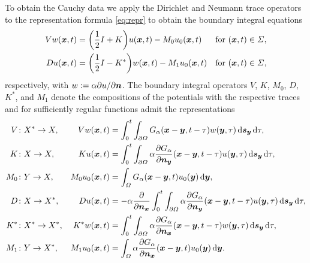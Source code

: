 \documentclass[a4paper,11pt]{article}
\begin{document}
To obtain the Cauchy data we apply the Dirichlet and Neumann trace operators to the representation formula \eqref{eq:repr} to obtain the boundary integral equations \cite{Cos1990,Cos2004,Noo1988,DohNiiSte2018}
\begin{align*}
  Vw({{\bm{x}}},t) &= \bigg(\frac{1}{2} I + K \bigg) u({{\bm{x}}},t) - M_0 u_0({{\bm{x}}},t) &&\text{for } ({{\bm{x}}},t) \in \Sigma, \\
  Du({{\bm{x}}},t) &= \bigg(\frac{1}{2} I - K^\ast \bigg) w({{\bm{x}}},t) - M_1 u_0({{\bm{x}}},t) &&\text{for } ({{\bm{x}}},t) \in \Sigma,
\end{align*}
respectively, with $w := \alpha\partial u/\partial {\ensuremath{{\bm{n}}}} $. The boundary integral operators $V$, $K$, $M_0$, $D$, $K^\ast$, and $M_1$ denote the compositions of the potentials with the respective traces and for sufficiently regular functions admit the representations
\begin{align*}
  V &\colon X^\ast \to X, &Vw({{\bm{x}}},t) &= \int_0^t \int_{\partial\Omega} G_\alpha({{\bm{x}}}-{{\bm{y}}},t-\tau) w({{\bm{y}}},\tau) \,{\mathrm{d}}{{\bm{s}}}_{{\bm{y}}} \,{\mathrm{d}}\tau, \\
  K &\colon X \to X, &Ku({{\bm{x}}},t) &= \int_0^t \int_{\partial\Omega} \alpha\frac{\partial G_\alpha}{\partial {\ensuremath{{\bm{n}}}}_{{\bm{y}}}}({{\bm{x}}}-{{\bm{y}}},t-\tau) u({{\bm{y}}},\tau) \,{\mathrm{d}}{{\bm{s}}}_{{\bm{y}}} \,{\mathrm{d}}\tau, \\
  M_0 &\colon Y \to X, &M_0 u_0({{\bm{x}}},t) &= \int_\Omega G_\alpha({{\bm{x}}}-{{\bm{y}}},t) u_0({{\bm{y}}}) \,{\mathrm{d}}{{\bm{y}}}, \\
  D &\colon X \to X^\ast, &Du({{\bm{x}}},t) &= -\alpha \frac{\partial}{\partial {\ensuremath{{\bm{n}}}}_{{\bm{x}}}} \int_0^t \int_{\partial\Omega} \alpha\frac{\partial G_\alpha}{\partial {\ensuremath{{\bm{n}}}}_{{\bm{y}}}}({{\bm{x}}}-{{\bm{y}}},t-\tau) u({{\bm{y}}},\tau) \,{\mathrm{d}}{{\bm{s}}}_{{\bm{y}}} \,{\mathrm{d}}\tau, \\
  K^\ast &\colon X^\ast \to X^\ast, &K^\ast w({{\bm{x}}},t) &= \int_0^t \int_{\partial\Omega} \alpha\frac{\partial G_\alpha}{\partial {\ensuremath{{\bm{n}}}}_{{\bm{x}}}}({{\bm{x}}}-{{\bm{y}}},t-\tau) w({{\bm{y}}},\tau) \,{\mathrm{d}}{{\bm{s}}}_{{\bm{y}}} \,{\mathrm{d}}\tau, \\
  M_1 &\colon Y \to X^\ast, &M_1 u_0({{\bm{x}}},t) &= \int_\Omega \alpha\frac{\partial G_\alpha}{\partial {\ensuremath{{\bm{n}}}}_{{\bm{x}}}}({{\bm{x}}}-{{\bm{y}}},t) u_0({{\bm{y}}}) \,{\mathrm{d}}{{\bm{y}}}.
\end{align*}
\end{document}
